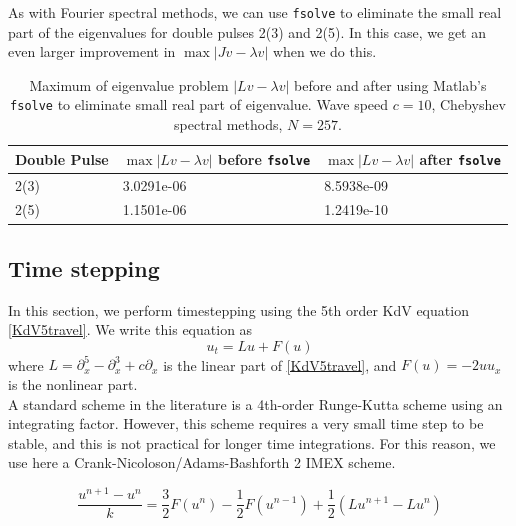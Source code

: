 \documentclass[12pt]{article}
\begin{document}
As with Fourier spectral methods, we can use \texttt{fsolve} to eliminate the small real part of the eigenvalues for double pulses 2(3) and 2(5). In this case, we get an even larger improvement in $\max{|Jv - \lambda v|}$ when we do this.

\begin{table}[H]
\begin{tabular}{l|ll}
 Double Pulse   & $\max{|Lv - \lambda v|}$ before \texttt{fsolve} & $\max{|Lv - \lambda v|}$ after \texttt{fsolve}\\ \hline
  2(3) & 3.0291e-06 & 8.5938e-09 \\
  2(5) & 1.1501e-06 & 1.2419e-10 \\
\end{tabular}
\caption{Maximum of eigenvalue problem $|Lv - \lambda v|$ before and after using Matlab's \texttt{fsolve} to eliminate small real part of eigenvalue. Wave speed $c = 10$, Chebyshev spectral methods, $N = 257$.}
\end{table}

\subsection{Time stepping}

In this section, we perform timestepping using the 5th order KdV equation \eqref{KdV5travel}. We write this equation as 
\begin{equation} \label{KdV5separated}
u_t = Lu + F(u)
\end{equation}
where $L = \partial_x^5 - \partial_x^3 + c \partial_x$ is the linear part of \eqref{KdV5travel}, and $F(u) = -2 u u_x$ is the nonlinear part.\\

A standard scheme in the literature is a 4th-order Runge-Kutta scheme using an integrating factor. However, this scheme requires a very small time step to be stable, and this is not practical for longer time integrations. For this reason, we use here a  Crank-Nicoloson/Adams-Bashforth 2 IMEX scheme.

\begin{equation}\label{scheme}
\frac{u^{n+1} - u^n}{k} = \frac{3}{2}F(u^n) - \frac{1}{2}F(u^{n-1}) + \frac{1}{2}\left(Lu^{n+1} - Lu^n \right) 
\end{equation}
\end{document}

